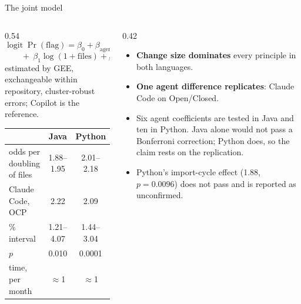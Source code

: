 \documentclass[11pt,aspectratio=169]{beamer}
\begin{document}
\begin{frame}{The joint model}
\begin{columns}[T,onlytextwidth]
\begin{column}{0.54\textwidth}
\small
{\footnotesize
\[ \operatorname{logit}\Pr(\text{flag})=\beta_0+\beta_{\text{agent}} \]
\vspace{-14pt}
\[ \qquad+\ \beta_1\log(1+\text{files})+\beta_2\,\text{months} \]}
estimated by GEE, exchangeable within repository, cluster-robust errors; Copilot is the reference.
\\[5pt]
\footnotesize
\begin{tabular}{@{}lcc@{}}
\toprule
& \textbf{Java} & \textbf{Python} \\
\midrule
odds per doubling of files & 1.88--1.95 & 2.01--2.18 \\
Claude Code, OCP & 2.22 & 2.09 \\
\quad 95\% interval & 1.21--4.07 & 1.44--3.04 \\
\quad $p$ & 0.010 & 0.0001 \\
time, per month & $\approx$1 & $\approx$1 \\
\bottomrule
\end{tabular}
\end{column}
\begin{column}{0.42\textwidth}
\begin{itemize}\setlength{\itemsep}{4pt}\small
  \item \textbf{Change size dominates} every principle in both languages.
  \item \textbf{One agent difference replicates}: Claude Code on Open/Closed.
  \item Six agent coefficients are tested in Java and ten in Python. Java alone would not pass a
        Bonferroni correction; Python does, so the claim rests on the replication.
  \item Python's import-cycle effect (1.88, $p=0.0096$) does not pass and is reported as
        unconfirmed.
\end{itemize}
\end{column}
\end{columns}
\end{frame}
\end{document}
